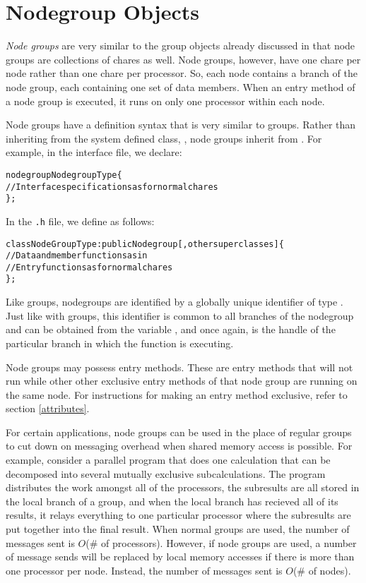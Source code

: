 \section{Nodegroup Objects}

{\it Node groups}\experimental{}   are very
similar to the group objects already discussed in that node groups are
collections of chares as well.  Node groups, however, have one chare per node
rather than one chare per processor.  So, each node contains a branch of the
node group, each containing one set of data members.  When an entry method of a
node group is executed, it runs on only one processor within each node.

Node groups have a definition syntax that is very similar to groups.  Rather
than inheriting from the system defined class, , node groups inherit
from .  For example, in the interface file, we declare:

\begin{alltt}
 nodegroup NodegroupType \{
  // Interface specifications as for normal chares
 \};
\end{alltt}

In the {\tt .h} file, we define  as follows:

\begin{alltt}
 class NodeGroupType : public Nodegroup [,other superclasses ] \{
  // Data and member functions as in \CC{}
  // Entry functions as for normal chares
 \};
\end{alltt}

Like groups, nodegroups are identified by a globally unique identifier of type
.  Just like with groups, this identifier is
common to all branches of the nodegroup and can be obtained from the variable
, and once again, 
 is the handle of the particular branch in which the function is
executing.

Node groups may possess  entry methods.  These
are entry methods that will not run while other other exclusive entry methods
of that node group are running on the same node.  For instructions for making
an entry method exclusive, refer to section \ref{attributes}.

For certain applications, node groups can be used in the place of regular
groups to cut down on messaging overhead when shared memory access is possible.
For example, consider a parallel program that does one calculation that can be
decomposed into several mutually exclusive subcalculations.  The program
distributes the work amongst all of the processors, the subresults are all
stored in the local branch of a group, and when the local branch has recieved
all of its results, it relays everything to one particular processor where the
subresults are put together into the final result.  When normal groups are
used, the number of messages sent is $O$(\# of processors).  However, if node
groups are used, a number of message sends will be replaced by local memory
accesses if there is more than one processor per node.  Instead, the number of
messages sent is $O$(\# of nodes).

